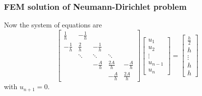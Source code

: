 \documentclass[12pt]{article}
\begin{document}
\subsubsection{FEM solution of Neumann-Dirichlet problem}
Now the system of equations are
\[
\begin{bmatrix}
\frac{1}{h} & -\frac{1}{h} \\
-\frac{1}{h} & \frac{2}{h} & -\frac{1}{h} \\
& \ddots & \ddots & \ddots \\
&& -\frac{A}{h} & \frac{2A}{h} & -\frac{A}{h} \\
&&& -\frac{A}{h} & \frac{2A}{h}
\end{bmatrix}
\begin{bmatrix}
u_{1} \\
u_{2} \\
\vdots \\
u_{n-1} \\
u_{n}
\end{bmatrix}
=
\begin{bmatrix}
\frac{h}{2} \\
h \\
\vdots \\
h \\
h
\end{bmatrix}
\]
with $u_{n+1}=0$.
\end{document}
